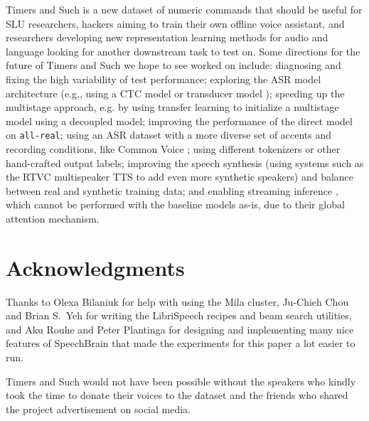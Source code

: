 \documentclass{article}
\begin{document}
Timers and Such is a new dataset of numeric commands that should be useful for SLU researchers, hackers aiming to train their own offline voice assistant, and researchers developing new representation learning methods for audio and language \cite{tamkin2020viewmaker, chung2020semi, pascual2019learning, baevski2020wav2vec} looking for another downstream task to test on. Some directions for the future of Timers and Such we hope to see worked on include: diagnosing and fixing the high variability of test performance; exploring the ASR model architecture (e.g., using a CTC model or transducer model \cite{graves2012sequence}); speeding up the multistage approach, e.g. by using transfer learning to initialize a multistage model using a decoupled model;  improving the performance of the direct model on \texttt{all-real}; using an ASR dataset with a more diverse set of accents and recording conditions, like Common Voice \cite{ardila2019common}; using different tokenizers or other hand-crafted output labels; improving the speech synthesis (using systems such as the RTVC multispeaker TTS  \cite{jia2018transfer, jemine2019master} to add even more synthetic speakers) and balance between real and synthetic training data; and enabling streaming inference \cite{mhiri2020low, potdar2021streaming}, which cannot be performed with the baseline models as-is, due to their global attention mechanism.

\section*{Acknowledgments}
Thanks to Olexa Bilaniuk for help with using the Mila cluster, Ju-Chieh Chou and Brian S.~Yeh for writing the LibriSpeech recipes and beam search utilities, and Aku Rouhe and Peter Plantinga for designing and implementing many nice features of SpeechBrain that made the experiments for this paper a lot easier to run. 

Timers and Such would not have been possible without the speakers who kindly took the time to donate their voices to the dataset and the friends who shared the project advertisement on social media.





\end{document}
